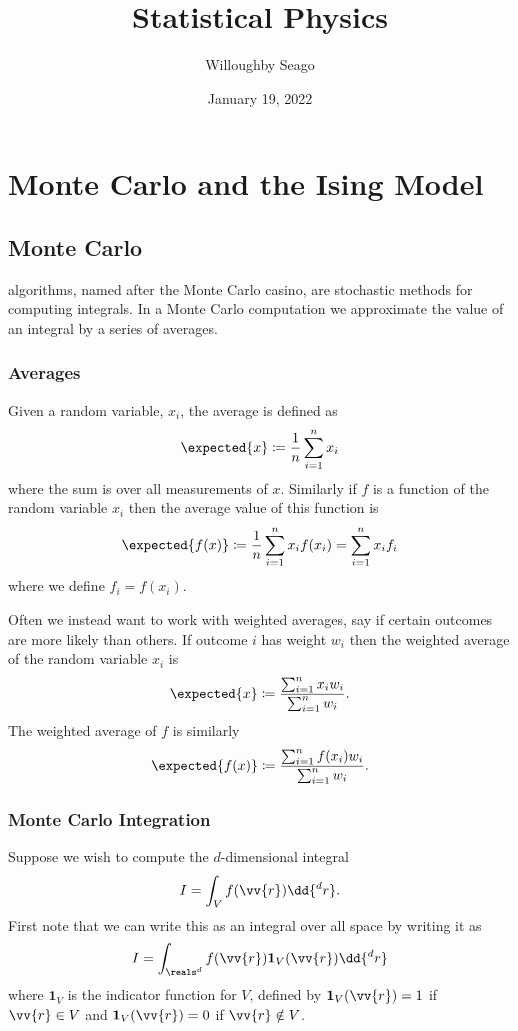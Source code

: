 \documentclass[fleqn]{NotesClass}
\title{Statistical Physics}
\author{Willoughby Seago}
\date{January 19, 2022}
\newcommand*{\indicator}{\mathbf{1}}
\begin{document}
    \frontmatter
    \titlepage
    \tableofcontents
    \listoffigures
    \mainmatter
    
    \part{Monte Carlo and the Ising Model}
    \chapter{Monte Carlo}
     algorithms, named after the Monte Carlo casino, are stochastic methods for computing integrals.
    In a Monte Carlo computation we approximate the value of an integral by a series of averages.
    
    \section{Averages}
    Given a random variable, \(x_i\), the average is defined as
    \begin{equation}
        \expected{x} \coloneqq \frac{1}{n} \sum_{i=1}^{n} x_i
    \end{equation}
    where the sum is over all measurements of \(x\).
    Similarly if \(f\) is a function of the random variable \(x_i\) then the average value of this function is
    \begin{equation}
        \expected{f(x)} \coloneqq \frac{1}{n} \sum_{i=1}^{n} x_if(x_i) = \sum_{i=1}^{n} x_if_i
    \end{equation}
    where we define \(f_i = f(x_i)\).
    
    Often we instead want to work with weighted averages, say if certain outcomes are more likely than others.
    If outcome \(i\) has weight \(w_i\) then the weighted average of the random variable \(x_i\) is
    \begin{equation}
        \expected{x} \coloneqq \frac{\sum_{i=1}^{n} x_iw_i}{\sum_{i=1}^{n} w_i}.
    \end{equation}
    The weighted average of \(f\) is similarly
    \begin{equation}
        \expected{f(x)} \coloneqq \frac{\sum_{i=1}^{n} f(x_i)w_i}{\sum_{i=1}^{n}w_i}.
    \end{equation}
    
    \section{Monte Carlo Integration}
    Suppose we wish to compute the \(d\)-dimensional integral
    \begin{equation}
        I = \int_V f(\vv{r}) \dd{^dr}.
    \end{equation}
    First note that we can write this as an integral over all space by writing it as
    \begin{equation}
        I = \int_{\reals^d} f(\vv{r}) \indicator_V(\vv{r}) \dd{^dr}
    \end{equation}
    where \(\indicator_V\) is the indicator function for \(V\), defined by \(\indicator_V(\vv{r}) = 1\) if \(\vv{r} \in V\) and \(\indicator_V(\vv{r}) = 0\) if \(\vv{r} \notin V\).
    
\end{document}
